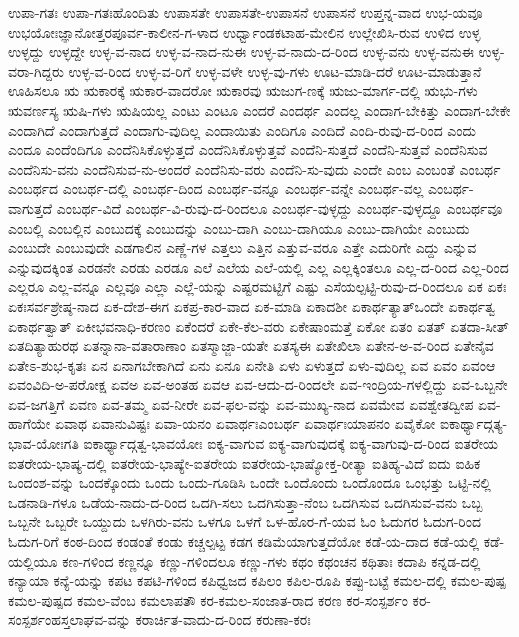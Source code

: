 {ಉಪಾ-ಗತಃ
ಉಪಾ-ಗತಃಹೊಂದಿತು
ಉಪಾಸತೇ
ಉಪಾಸತೇ-ಉಪಾಸನೆ
ಉಪಾಸನೆ
ಉಪ್ತನ್ನ-ವಾದ
ಉಭ-ಯವೂ
ಉಭಯೋಃಜ್ಞಾನೋತ್ತರಪೂರ್ವ-ಕಾಲೀನ-ಗ-ಳಾದ
ಉರ್ಧ್ವಾಂಡಕಟಾಹ-ಮೇಲಿನ
ಉಲ್ಲೇಖಿಸಿ-ರುವ
ಉಳಿದ
ಉಳ್ಳ
ಉಳ್ಳದ್ದು
ಉಳ್ಳದ್ದೇ
ಉಳ್ಳ-ವ-ನಾದ
ಉಳ್ಳ-ವ-ನಾದ-ನುಈ
ಉಳ್ಳ-ವ-ನಾದು-ದ-ರಿಂದ
ಉಳ್ಳ-ವನು
ಉಳ್ಳ-ವನುಈ
ಉಳ್ಳ-ವರಾ-ಗಿದ್ದರು
ಉಳ್ಳ-ವ-ರಿಂದ
ಉಳ್ಳ-ವ-ರಿಗೆ
ಉಳ್ಳ-ವಳೇ
ಉಳ್ಳ-ವು-ಗಳು
ಊಟ-ಮಾಡಿ-ದರೆ
ಊಟ-ಮಾಡುತ್ತಾನೆ
ಊಹಿಸಲೂ
ಋ
ಋಕಾರಕ್ಕೆ
ಋಕಾರ-ವಾದರೋ
ಋಕಾರವು
ಋಜುಗ-ಣಕ್ಕೆ
ಋಜು-ಮಾರ್ಗ-ದಲ್ಲಿ
ಋಭು-ಗಳು
ಋವರ್ಣಸ್ಯ
ಋಷಿ-ಗಳು
ಋಷಿಯಲ್ಲ
ಎಂಟು
ಎಂಟೂ
ಎಂದರೆ
ಎಂದರ್ಥ
ಎಂದಲ್ಲ
ಎಂದಾಗ-ಬೇಕಿತ್ತು
ಎಂದಾಗ-ಬೇಕೇ
ಎಂದಾಗಿದೆ
ಎಂದಾಗುತ್ತದೆ
ಎಂದಾಗು-ವುದಿಲ್ಲ
ಎಂದಾಯಿತು
ಎಂದಿಗೂ
ಎಂದಿದೆ
ಎಂದಿ-ರುವು-ದ-ರಿಂದ
ಎಂದು
ಎಂದೂ
ಎಂದೆಂದಿಗೂ
ಎಂದೆನಿಸಿಕೊಳ್ಳುತ್ತದೆ
ಎಂದೆನಿಸಿಕೊಳ್ಳುತ್ತವೆ
ಎಂದೆನಿ-ಸುತ್ತದೆ
ಎಂದೆನಿ-ಸುತ್ತವೆ
ಎಂದೆನಿಸುವ
ಎಂದೆನಿಸು-ವನು
ಎಂದೆನಿಸುವ-ನು-ಅಂದರೆ
ಎಂದೆನಿಸು-ವರು
ಎಂದೆನಿ-ಸು-ವುದು
ಎಂದೇ
ಎಂಬ
ಎಂಬಂತೆ
ಎಂಬರ್ಥ
ಎಂಬರ್ಥದ
ಎಂಬರ್ಥ-ದಲ್ಲಿ
ಎಂಬರ್ಥ-ದಿಂದ
ಎಂಬರ್ಥ-ವನ್ನೂ
ಎಂಬರ್ಥ-ವನ್ನೇ
ಎಂಬರ್ಥ-ವಲ್ಲ
ಎಂಬರ್ಥ-ವಾಗುತ್ತದೆ
ಎಂಬರ್ಥ-ವಿದೆ
ಎಂಬರ್ಥ-ವಿ-ರುವು-ದ-ರಿಂದಲೂ
ಎಂಬರ್ಥ-ವುಳ್ಳದ್ದು
ಎಂಬರ್ಥ-ವುಳ್ಳದ್ದೂ
ಎಂಬರ್ಥವೂ
ಎಂಬಲ್ಲಿ
ಎಂಬಲ್ಲಿನ
ಎಂಬುದಕ್ಕೆ
ಎಂಬುದನ್ನು
ಎಂಬು-ದಾಗಿ
ಎಂಬು-ದಾಗಿಯೂ
ಎಂಬು-ದಾಗಿಯೇ
ಎಂಬುದು
ಎಂಬುದೇ
ಎಂಬುವುದೇ
ಎಡಗಾಲಿನ
ಎಣ್ಣೆ-ಗಳ
ಎತ್ತಲು
ಎತ್ತಿನ
ಎತ್ತುವ-ವರೂ
ಎತ್ತೇ
ಎದುರಿಗೇ
ಎದ್ದು
ಎನ್ನುವ
ಎನ್ನುವುದಕ್ಕಿಂತ
ಎರಡನೇ
ಎರಡು
ಎರಡೂ
ಎಲೆ
ಎಲೆಯ
ಎಲೆ-ಯಲ್ಲಿ
ಎಲ್ಲ
ಎಲ್ಲಕ್ಕಿಂತಲೂ
ಎಲ್ಲ-ದ-ರಿಂದ
ಎಲ್ಲ-ರಿಂದ
ಎಲ್ಲರೂ
ಎಲ್ಲ-ವನ್ನೂ
ಎಲ್ಲವೂ
ಎಲ್ಲಾ
ಎಲ್ಲೆ-ಯನ್ನು
ಎಷ್ಟರಮಟ್ಟಿಗೆ
ಎಷ್ಟು
ಎಸೆಯಲ್ಪಟ್ಟಿ-ರುವು-ದ-ರಿಂದಲೂ
ಏಕ
ಏಕಃ
ಏಕಃಸರ್ವಶ್ರೇಷ್ಠ-ನಾದ
ಏಕ-ದೇಶ-ಈಗ
ಏಕಪ್ರ-ಕಾರ-ವಾದ
ಏಕ-ಮಾಡಿ
ಏಕಾದಶೀ
ಏಕಾರ್ಥತ್ಯಾತ್ಒಂದೇ
ಏಕಾರ್ಥತ್ವ
ಏಕಾರ್ಥತ್ವಾತ್
ಏಕೀಭವನಾಧಿ-ಕರಣಂ
ಏಕೆಂದರೆ
ಏಕೇ-ಕೆಲ-ವರು
ಏಕೇಷಾಂಮತ್ತೆ
ಏಕೋ
ಏತಂ
ಏತತ್
ಏತದಾ-ಸೀತ್
ಏತದಿತ್ಯಾಹುರಥ
ಏತನ್ನಾನಾ-ವತಾರಾಣಾಂ
ಏತಸ್ಮಾಜ್ಜಾ-ಯತೇ
ಏತಸ್ಯಈ
ಏತೇಖಿಲಾ
ಏತೇನ-ಅ-ವ-ರಿಂದ
ಏತೇನೈವ
ಏತೇಽ-ಶುಭ-ಕೃತಃ
ಏನ
ಏನಾಗಬೇಕಾಗಿದೆ
ಏನು
ಏನೂ
ಏನೇತಿ
ಏಳು
ಏಳುತ್ತದೆ
ಏಳು-ವುದಿಲ್ಲ
ಏವ
ಏವಂ
ಏವಂಆ
ಏವಂವಿದಿ-ಅ-ಪರೋಕ್ಷ
ಏವಅ
ಏವ-ಅಂತಹ
ಏವಆ
ಏವ-ಆದು-ದ-ರಿಂದಲೇ
ಏವ-ಇಂದ್ರಿಯ-ಗಳಲ್ಲಿದ್ದು
ಏವ-ಒಬ್ಬನೇ
ಏವ-ಜಗತ್ತಿಗೆ
ಏವಣ
ಏವ-ತಮ್ಮ
ಏವ-ನೀರೇ
ಏವ-ಫಲ-ವನ್ನು
ಏವ-ಮುಖ್ಯ-ನಾದ
ಏವಮೇವ
ಏವಶ್ವೇತದ್ವೀಪ
ಏವ-ಹಾಗೆಯೇ
ಏವಾಥ
ಏವಾನುವಿಷ್ಟಃ
ಏವಾ-ಯನಂ
ಏವಾರ್ಥಃಎಂಬರ್ಥ
ಏವಾರ್ಥಃಯಾಪನಂ
ಏವೈಕೋ
ಐಕಾರ್ಥ್ಯಾದ್ಗತ್ಯ-ಭಾವ-ಯೋಃಗತಿ
ಐಕಾರ್ಥ್ಯಾದ್ಗತ್ವ-ಭಾವಯೋಃ
ಐಕ್ಯ-ವಾಗುವ
ಐಕ್ಯ-ವಾಗುವುದಕ್ಕೆ
ಐಕ್ಯ-ವಾಗುವು-ದ-ರಿಂದ
ಐತರೇಯ
ಐತರೇಯ-ಭಾಷ್ಯ-ದಲ್ಲಿ
ಐತರೇಯ-ಭಾಷ್ಯೇ-ಐತರೇಯ
ಐತರೇಯ-ಭಾಷ್ಯೋಕ್ತ-ರೀತ್ಯಾ
ಐತಿಹ್ಯ-ವಿದೆ
ಐದು
ಐಹಿಕ
ಒಂದಂಶ-ವನ್ನು
ಒಂದಕ್ಕೊಂದು
ಒಂದು
ಒಂದು-ಗೂಡಿಸಿ
ಒಂದೇ
ಒಂದೊಂದು
ಒಂದೊಂದೂ
ಒಂಭತ್ತು
ಒಟ್ಟಿ-ನಲ್ಲಿ
ಒಡನಾಡಿ-ಗಳೂ
ಒಡೆಯ-ನಾದು-ದ-ರಿಂದ
ಒದಗಿ-ಸಲು
ಒದಗಿಸುತ್ತಾ-ನೆಂಬ
ಒದಗಿಸುವ
ಒದಗಿಸುವ-ವನು
ಒಬ್ಬ
ಒಬ್ಬನೇ
ಒಬ್ಬರೇ
ಒಯ್ದುದು
ಒಳಗಿರು-ವನು
ಒಳಗೂ
ಒಳಗೆ
ಒಳ-ಹೊರ-ಗೆ-ಯವ
ಓಂ
ಓದುಗರ
ಓದುಗ-ರಿಂದ
ಓದುಗ-ರಿಗೆ
ಕಂಠ-ದಿಂದ
ಕಂಡಂತೆ
ಕಂಡು
ಕಚ್ಚಲ್ಪಟ್ಟ
ಕಡಗ
ಕಡಿಮೆಯಾಗುತ್ತದೆಯೋ
ಕಡೆ-ಯ-ದಾದ
ಕಡೆ-ಯಲ್ಲಿ
ಕಡೆ-ಯಲ್ಲಿಯೂ
ಕಣ-ಗಳಿಂದ
ಕಣ್ಣನ್ನೂ
ಕಣ್ಣು-ಗಳಿಂದಲೂ
ಕಣ್ಣು-ಗಳು
ಕಥಂ
ಕಥಂಚನ
ಕಥಿತಾಃ
ಕದಾಪಿ
ಕನ್ನಡ-ದಲ್ಲಿ
ಕನ್ಯಾಯಾ
ಕನ್ಯೆ-ಯನ್ನು
ಕಪಟ
ಕಪಟಿ-ಗಳಿಂದ
ಕಪಿಧ್ವಜದ
ಕಪಿಲಂ
ಕಪಿಲ-ರೂಪಿ
ಕಪ್ಪು-ಬಟ್ಟೆ
ಕಮಲ-ದಲ್ಲಿ
ಕಮಲ-ಪುಷ್ಪ
ಕಮಲ-ಪುಷ್ಪದ
ಕಮಲ-ವೆಂಬ
ಕಮಲಾಪತೌ
ಕರ-ಕಮಲ-ಸಂಜಾತ-ರಾದ
ಕರಣ
ಕರ-ಸಂಸ್ಪರ್ಶಂ
ಕರ-ಸಂಸ್ಪರ್ಶಂಹಸ್ತಲಾಘವ-ವನ್ನು
ಕರಾರ್ಚಿತ-ವಾದು-ದ-ರಿಂದ
ಕರುಣಾ-ಕರಃ
}
